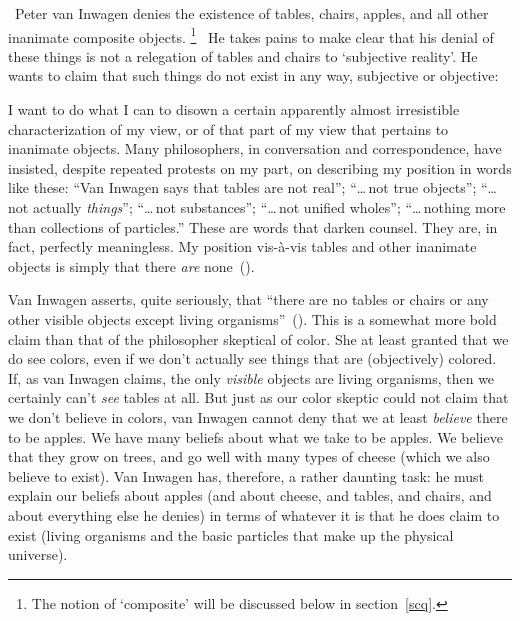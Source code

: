\documentclass[11pt]{standalone}
\newenvironment{squote}{%
	\begin{spacing}{1}
	\begin{list}{}{%
	\setlength{\labelwidth}{0pt}%
	\rightmargin\leftmargin%
	}
	\item\relax
	}{%
	\end{list}%
	\end{spacing}
	}
\begin{document}
\begin{spacing}{1.5}
\ Peter van Inwagen denies the existence of tables, chairs, apples,
and all other inanimate composite objects.
%
\footnote{The notion of `composite' will be discussed below in
  section~\ref{scq}.}
%
\ He takes pains to make clear that his denial of these things is not
a relegation of tables and chairs to `subjective reality'.  He wants
to claim that such things do not exist in any way, subjective or
objective:
\begin{squote}
I want to do what I can to disown a certain apparently almost
irresistible characterization of my view, or of that part of my view
that pertains to inanimate objects.  Many philosophers, in
conversation and correspondence, have insisted, despite repeated
protests on my part, on describing my position in words like these:
``Van Inwagen says that tables are not real''; ``\ldots\,not true
objects''; ``\ldots\,not actually {\em things}''; ``\ldots\,not
substances''; ``\ldots\,not unified wholes''; ``\ldots\,nothing more
than collections of particles.''  These are words that darken counsel.
They are, in fact, perfectly meaningless.  My position vis-\`{a}-vis
tables and other inanimate objects is simply that there {\em are}
none~(\citeyear[99]{inwagen1995}).
\end{squote}
Van Inwagen asserts, quite seriously, that ``there are no tables or
chairs or any other visible objects except living
organisms''~(\citeyear[1]{inwagen1995}).  This is a somewhat more bold
claim than that of the philosopher skeptical of color.  She at least
granted that we do see colors, even if we don't actually see things
that are (objectively) colored.  If, as van Inwagen claims, the only
{\em visible} objects are living organisms, then we certainly can't
{\em see} tables at all.  But just as our color skeptic could not
claim that we don't believe in colors, van Inwagen cannot deny that we
at least {\em believe} there to be apples.  We have many beliefs about
what we take to be apples.  We believe that they grow on trees, and go
well with many types of cheese (which we also believe to exist).  Van
Inwagen has, therefore, a rather daunting task: he must explain our
beliefs about apples (and about cheese, and tables, and chairs, and
about everything else he denies) in terms of whatever it is that he
does claim to exist (living organisms and the basic particles that
make up the physical universe).


\end{spacing}
\end{document}
